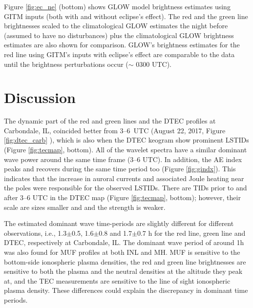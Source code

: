 \documentclass[crop=false,class=mitthesis,oneside,font=12pt]{standalone}
\begin{document}
% 
% 
 Figure \ref{fig:ec_ne} (bottom) shows GLOW model brightness estimates using GITM inputs (both with and without eclipse's effect). The red and the green line brightnesses scaled to the climatological GLOW estimates the night before (assumed to have no disturbances) plus the climatological GLOW brightness estimates are also shown for comparison. GLOW's brightness estimates for the red line using GITM's inputs  with eclipse's effect are comparable to the data until the brightness perturbations occur ($\sim$ 0300 UTC). 
   


\section{Discussion}
The dynamic part of the red and green lines and the DTEC profiles at Carbondale, IL, coincided better from 3--6~UTC (August 22, 2017, Figure \ref{fig:dtec_carb} ), which is also when the DTEC keogram show prominent LSTIDs (Figure \ref{fig:tecmap}, bottom). All of the wavelet spectra have a similar dominant wave power around the same time frame (3--6 UTC). In addition, the AE index peaks and recovers during the same time period too (Figure \ref{fig:gindx}). This indicates that the increase in auroral currents and associated Joule heating near the poles were responsible for the observed LSTIDs. There are TIDs prior to and after 3--6 UTC in the DTEC map (Figure \ref{fig:tecmap}, bottom); however, their scale are sizes smaller and and the strength is weaker. 

The estimated dominant wave time-periods are slightly different for different observations, i.e., 1.3$\pm$0.5, 1.6$\pm$0.8 and 1.7$\pm$0.7 h for the red line, green line and DTEC, respectively at Carbondale, IL. The dominant wave period of around 1h was also found for MUF profiles at both INL and MH. MUF is sensitive to the bottom-side ionospheric plasma densities, the red and green line brightnesses are sensitive to both the plasma and the neutral densities at the altitude they peak at, and the TEC measurements are sensitive to the line of sight ionospheric plasma density. These differences could explain the discrepancy in dominant time periods. 
\end{document}
